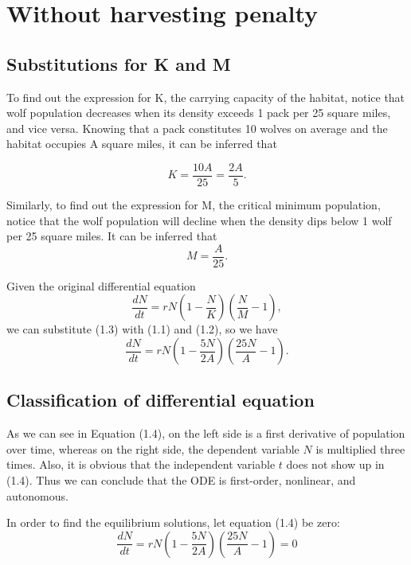\documentclass{amsart}
\theoremstyle{definition}
\theoremstyle{remark}
\numberwithin{equation}{section}
\begin{document}
\section{Without harvesting penalty}

\subsection{Substitutions for K and M}

To find out the expression for K, the carrying capacity of the habitat, notice that wolf population decreases when its density exceeds 1 pack per 25 square miles, and vice versa. Knowing that a pack constitutes 10 wolves on average and the habitat occupies A square miles, it can be inferred that

\begin{equation}
    K = \frac{10A}{25}=\frac{2A}{5}.
\end{equation}

Similarly, to find out the expression for M, the critical minimum population, notice that the wolf population will decline when the density dips below 1 wolf per 25 square miles. It can be inferred that
\begin{equation}
    M=\frac{A}{25}.
\end{equation}

Given the original differential equation
\begin{equation}
    \frac{dN}{dt}=rN(1-\frac{N}{K})(\frac{N}{M}-1),
\end{equation}
we can substitute (1.3) with (1.1) and (1.2), so we have
\begin{equation}
    \frac{dN}{dt}=rN(1-\frac{5N}{2A})(\frac{25N}{A}-1).
\end{equation}

\subsection{Classification of differential equation}

As we can see in Equation (1.4), on the left side is a first derivative of population over time, whereas on the right side, the dependent variable $N$ is multiplied three times. Also, it is obvious that the independent variable $t$ does not show up in (1.4). Thus we can conclude that the ODE is first-order, nonlinear, and autonomous.


In order to find the equilibrium solutions, let equation (1.4) be zero:
\begin{equation}
    \frac{dN}{dt}=rN(1-\frac{5N}{2A})(\frac{25N}{A}-1)=0
\end{equation}
\end{document}
